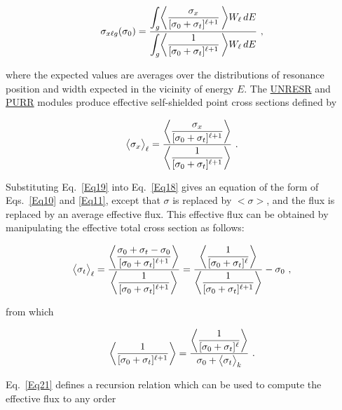   \begin{equation}
    \sigma_{x\ell g}(\sigma_0)=
    {\displaystyle{\int_g\biggl<{{\sigma_x}\over{[\sigma_0+\sigma_t]^{\ell+1}}}
    \,\biggr>W_{\ell}\,dE}
    \over\displaystyle{\int_g\biggl<{1\over{[\sigma_0+\sigma_t]^{\ell+1}}}
    \,\biggr>W_{\ell}\,dE}}\,\,,
  \label{Eq18}
  \end{equation}

\noindent
where the expected values are averages over the distributions of
resonance position and width expected in the vicinity of energy $E$.
The \hyperlink{sUNRESRhy}{UNRESR} and \hyperlink{sPURRhy}{PURR}
modules produce effective self-shielded point
cross sections defined by

  \begin{equation}
    \bigl<\sigma_x\bigr>_{\ell}=
    {{\displaystyle{\biggl<{{\sigma_x}\over{[\sigma_0
    +\sigma_t]^{\ell+1}}}}\biggr>}
    \over\displaystyle{\biggl<
    {1\over{[\sigma_0+\sigma_t]^{\ell+1}}}\biggr>}}\,\,.
  \label{Eq19}
  \end{equation}

\noindent
Substituting Eq.~\ref{Eq19} into Eq.~\ref{Eq18} gives an equation of
the form of Eqs.~\ref{Eq10} and \ref{Eq11}, except that $\sigma$ is
replaced by $\bigl<\sigma\bigr>$, and the flux is replaced by an average
effective flux.  This effective flux can be obtained by manipulating the
effective total cross section as follows:

  \begin{equation}
    \bigl<\sigma_t\bigr>_{\ell}=
    {\displaystyle{\biggl<{{\sigma_0+\sigma_t-\sigma_0}
    \over{[\sigma_0+\sigma_t]^{\ell+1}}}\biggr>}
    \over\displaystyle{\biggl<{{1}\over
    {[\sigma_0+\sigma_t]^{\ell+1}}}\biggr>}}
    ={\displaystyle{\biggl<{1
    \over{[\sigma_0+\sigma_t]^{\ell}}}\biggr>}
    \over\displaystyle{\biggl<{{1}\over
    {[\sigma_0+\sigma_t]^{\ell+1}}}\biggr>}}-\sigma_0\,\,,
  \end{equation}

\noindent
from which

  \begin{equation}
    \biggl<{{1}\over{[\sigma_0+\sigma_t]^{\ell+1}}}\biggr>
    = {\displaystyle{\biggl<{{1}\over{[\sigma_0+\sigma_t]^{\ell}}}\biggr>}
    \over{\sigma_0+\bigl<\sigma_t\bigr>_k}}\,\,.
  \label{Eq21}
  \end{equation}

\noindent
Eq.~\ref{Eq21} defines a recursion relation which can be used to compute
the effective flux to any order

